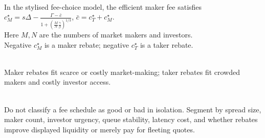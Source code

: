 \begin{definition} \\
In the stylised fee-choice model, the efficient maker fee satisfies $c_M^\star=s\Delta-\frac{\Gamma-\bar{c}}{1+\left(\frac{M}{N}\frac{\gamma}{\beta}\right)^{1/3}}$, $\bar{c}=c_T^\star+c_M^\star$.\\
Here $M,N$ are the numbers of market makers and investors.\\
Negative $c_M^\star$ is a maker rebate; negative $c_T^\star$ is a taker rebate.
\end{definition}

\begin{caveat} \\
Maker rebates fit scarce or costly market-making; taker rebates fit crowded makers and costly investor access.
\end{caveat}

\begin{practitionernote} \\
Do not classify a fee schedule as good or bad in isolation. Segment by spread size, maker count, investor urgency, queue stability, latency cost, and whether rebates improve displayed liquidity or merely pay for fleeting quotes.
\end{practitionernote}
